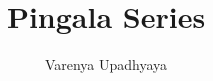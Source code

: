 \documentclass[journal,12pt,twocolumn]{IEEEtran}
\begin{document}
\makeatletter
{}
\makeatother
\let\StandardTheFigure\thefigure
\renewcommand{\thefigure}{\theproblem}
\def\putbox#1#2#3{\makebox[0in][l]{\makebox[#1][l]{}\raisebox{\baselineskip}[0in][0in]{\raisebox{#2}[0in][0in]{#3}}}}
     \def\rightbox#1{\makebox[0in][r]{#1}}
     \def\centbox#1{\makebox[0in]{#1}}
     \def\topbox#1{\raisebox{-\baselineskip}[0in][0in]{#1}}
     \def\midbox#1{\raisebox{-0.5\baselineskip}[0in][0in]{#1}}
\vspace{3cm}
\title{ 
Pingala Series
}
%
%
%
\author{ Varenya Upadhyaya}
\end{document}
